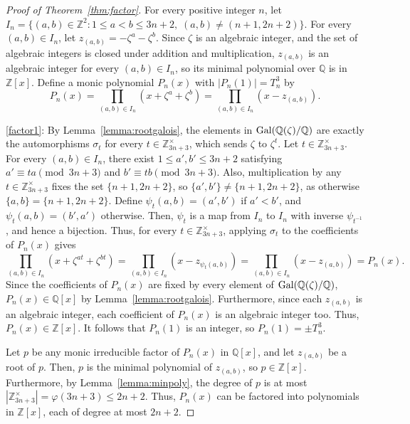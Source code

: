 \documentclass{article}
\begin{document}
\begin{proof}[Proof of Theorem~\ref{thm:factor}]
For every positive integer $n$, let $I_n=\{(a,b)\in\mathbb{Z}^2:1\leq a<b\leq 3n+2,\;(a,b)\not=(n+1,2n+2)\}$. For every $(a,b)\in I_n$, let $z_{(a,b)}=-\zeta^a-\zeta^b$. Since $\zeta$ is an algebraic integer, and the set of algebraic integers is closed under addition and multiplication, $z_{(a,b)}$ is an algebraic integer for every $(a,b)\in I_n$, so its minimal polynomial over $\mathbb{Q}$ is in $\mathbb{Z}[x]$. Define a monic polynomial $P_n(x)$ with $|P_n(1)|=T_n^3$ by
\[P_n(x)=\prod_{(a,b)\in I_n}(x+\zeta^a+\zeta^b)=\prod_{(a,b)\in I_n}(x-z_{(a,b)}).\]

\ref{factor1}: By Lemma~\ref{lemma:rootgalois}, the elements in $\textup{Gal}(\mathbb{Q}(\zeta)/\mathbb{Q})$ are exactly the automorphisms $\sigma_t$ for every $t\in\mathbb{Z}_{3n+3}^\times$, which sends $\zeta$ to $\zeta^t$. Let $t\in\mathbb{Z}_{3n+3}^\times$. For every $(a,b)\in I_n$, there exist $1\leq a',b'\leq 3n+2$ satisfying $a'\equiv ta\pmod{3n+3}$ and $b'\equiv tb\pmod{3n+3}$. Also, multiplication by any $t\in\mathbb{Z}_{3n+3}^\times$ fixes the set $\{n+1,2n+2\}$, so $\{a',b'\}\not=\{n+1,2n+2\}$, as otherwise $\{a,b\}=\{n+1,2n+2\}$. Define $\psi_t(a,b)=(a',b')$ if $a'<b'$, and $\psi_t(a,b)=(b',a')$ otherwise. Then, $\psi_t$ is a map from $I_n$ to $I_n$ with inverse $\psi_{t^{-1}}$, and hence a bijection. Thus, for every $t\in\mathbb{Z}_{3n+3}^\times$, applying $\sigma_t$ to the coefficients of $P_n(x)$ gives
\[\prod_{(a,b)\in I_n}(x+\zeta^{at}+\zeta^{bt})=\prod_{(a,b)\in I_n}(x-z_{\psi_t(a,b)})=\prod_{(a,b)\in I_n}(x-z_{(a,b)})=P_n(x).\]
Since the coefficients of $P_n(x)$ are fixed by every element of $\textup{Gal}(\mathbb{Q}(\zeta)/\mathbb{Q})$, $P_n(x)\in\mathbb{Q}[x]$ by Lemma~\ref{lemma:rootgalois}. Furthermore, since each $z_{(a,b)}$ is an algebraic integer, each coefficient of $P_n(x)$ is an algebraic integer too. Thus, $P_n(x)\in\mathbb{Z}[x]$. It follows that $P_n(1)$ is an integer, so $P_n(1)=\pm T_n^3$.

Let $p$ be any monic irreducible factor of $P_n(x)$ in $\mathbb{Q}[x]$, and let $z_{(a,b)}$ be a root of $p$. Then, $p$ is the minimal polynomial of $z_{(a,b)}$, so $p\in\mathbb{Z}[x]$. Furthermore, by Lemma~\ref{lemma:minpoly}, the degree of $p$ is at most $|\mathbb{Z}_{3n+3}^\times|=\varphi(3n+3)\leq 2n+2$. Thus, $P_n(x)$ can be factored into polynomials in $\mathbb{Z}[x]$, each of degree at most $2n+2$.



\end{proof}
\end{document}
